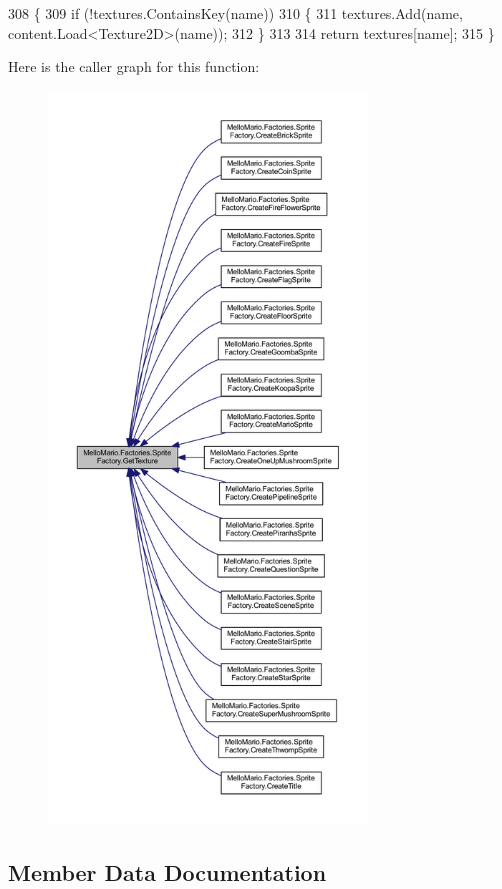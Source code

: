 \begin{DoxyCode}
308         \{
309             \textcolor{keywordflow}{if} (!textures.ContainsKey(name))
310             \{
311                 textures.Add(name, content.Load<Texture2D>(name));
312             \}
313 
314             \textcolor{keywordflow}{return} textures[name];
315         \}
\end{DoxyCode}
Here is the caller graph for this function\+:
\nopagebreak
\begin{figure}[H]
\begin{center}
\leavevmode
\includegraphics[height=550pt]{classMelloMario_1_1Factories_1_1SpriteFactory_a1030a47545499fbe9d96173df465b349_icgraph}
\end{center}
\end{figure}


\subsection{Member Data Documentation}
\mbox{\label{classMelloMario_1_1Factories_1_1SpriteFactory_a9d600eff314a4a24d4372322aaeecf5d}} 

